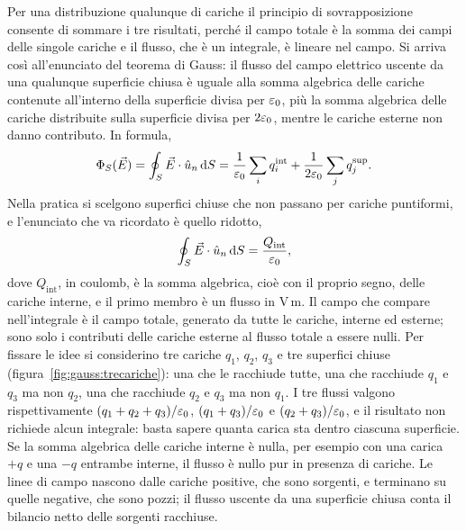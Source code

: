 \documentclass[11pt,a4paper]{article}
\begin{document}
Per una distribuzione qualunque di cariche il principio di sovrapposizione consente di sommare i tre risultati, perché il campo totale è la somma dei campi delle singole cariche e il flusso, che è un integrale, è lineare nel campo. Si arriva così all'enunciato del teorema di Gauss: il flusso del campo elettrico uscente da una qualunque superficie chiusa è uguale alla somma algebrica delle cariche contenute all'interno della superficie divisa per $\varepsilon_0$, più la somma algebrica delle cariche distribuite sulla superficie divisa per $2\varepsilon_0$, mentre le cariche esterne non danno contributo. In formula,
\begin{equation}
\Phi_S(\vec{E})=\oint_S\vec{E}\cdot\hat{u}_n\,\mathrm{d} S=\frac{1}{\varepsilon_0}\sum_i q_i^{\mathrm{int}}+\frac{1}{2\varepsilon_0}\sum_j q_j^{\mathrm{sup}} .
\label{eq:gauss:gaussgen}
\end{equation}
Nella pratica si scelgono superfici chiuse che non passano per cariche puntiformi, e l'enunciato che va ricordato è quello ridotto,
\begin{equation}
\oint_S\vec{E}\cdot\hat{u}_n\,\mathrm{d} S=\frac{Q_{\mathrm{int}}}{\varepsilon_0},
\label{eq:gauss:gauss}
\end{equation}
dove $Q_{\mathrm{int}}$, in coulomb, è la somma algebrica, cioè con il proprio segno, delle cariche interne, e il primo membro è un flusso in $\mathrm{V\,m}$. Il campo che compare nell'integrale è il campo totale, generato da tutte le cariche, interne ed esterne; sono solo i contributi delle cariche esterne al flusso totale a essere nulli. Per fissare le idee si considerino tre cariche $q_1$, $q_2$, $q_3$ e tre superfici chiuse (figura~\ref{fig:gauss:trecariche}): una che le racchiude tutte, una che racchiude $q_1$ e $q_3$ ma non $q_2$, una che racchiude $q_2$ e $q_3$ ma non $q_1$. I tre flussi valgono rispettivamente $(q_1+q_2+q_3)/\varepsilon_0$, $(q_1+q_3)/\varepsilon_0$ e $(q_2+q_3)/\varepsilon_0$, e il risultato non richiede alcun integrale: basta sapere quanta carica sta dentro ciascuna superficie. Se la somma algebrica delle cariche interne è nulla, per esempio con una carica $+q$ e una $-q$ entrambe interne, il flusso è nullo pur in presenza di cariche. Le linee di campo nascono dalle cariche positive, che sono sorgenti, e terminano su quelle negative, che sono pozzi; il flusso uscente da una superficie chiusa conta il bilancio netto delle sorgenti racchiuse.
\end{document}
